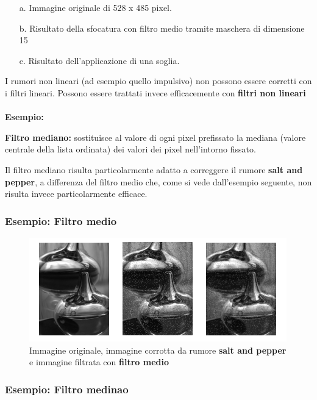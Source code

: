 \begin{enumerate}
    \item [a.] Immagine originale di 528 x 485 pixel.
    \item [b.] Risultato della sfocatura con filtro medio tramite maschera di dimensione 15
    \item [c.]  Risultato dell'applicazione di una soglia.
\end{enumerate}
I rumori non lineari (ad esempio quello impulsivo) non possono essere corretti con i filtri lineari.
Possono essere trattati invece efficacemente con \textbf{filtri non lineari}
\\\\
\textbf{Esempio:}
\begin{trivlist}
    \item \textbf{Filtro mediano:}  sostituisce al valore di ogni pixel prefissato la
    mediana (valore centrale della lista ordinata) dei
    valori dei pixel nell'intorno fissato.
\end{trivlist}
Il filtro mediano risulta particolarmente adatto a correggere il rumore \textbf{salt and pepper}, a differenza del filtro medio che, come si
vede dall'esempio seguente, non risulta invece particolarmente efficace.

\subsubsection{Esempio: Filtro medio}

\begin{figure}[H]
    \centering
    \includegraphics[width=\linewidth, keepaspectratio]{capitoli/immagini/imgs/esempio-filtro-medio.png}
    \caption*{Immagine originale, immagine corrotta da rumore \textbf{salt and pepper} e immagine filtrata con \textbf{filtro medio}}
\end{figure}

\subsubsection{Esempio: Filtro medinao}

